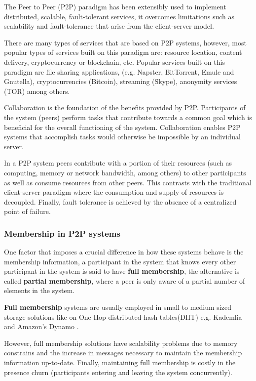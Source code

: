 

The Peer to Peer (P2P) paradigm has been extensibly used to implement distributed, scalable, fault-tolerant services, it overcomes limitations such as scalability and fault-tolerance that arise from the client-server model. 

There are many types of services that are based on P2P systems, however, most popular types of services built on this paradigm are: resource location, content delivery, cryptocurrency or blockchain, etc. Popular services built on this paradigm are file sharing applications, (e.g. Napster, BitTorrent, Emule and Gnutella), cryptocurrencies (Bitcoin), streaming (Skype), anonymity services (TOR) among others. 

Collaboration is the foundation of the benefits provided by P2P. Participants of the system (peers) perform tasks that contribute towards a common goal which is beneficial for the overall functioning of the system. Collaboration enables P2P systems that accomplish tasks would otherwise be impossible by an individual server.  %

In a P2P system peers contribute with a portion of their resources (such as computing, memory or network bandwidth, among others) to other participants as well as consume resources from other peers. This contrasts with the traditional client-server paradigm where the consumption and supply of resources is decoupled. Finally, fault tolerance is achieved by the absence of a centralized point of failure.

\subsubsection{Membership in P2P systems}

One factor that imposes a crucial difference in how these systems behave is the membership information, a participant in the system that knows every other participant in the system is said to have \textbf{full membership}, the alternative is called \textbf{partial membership}, where a peer is only aware of a partial number of elements in the system.

\textbf{Full membership} systems are usually employed in small to medium sized storage solutions like on One-Hop distributed hash tables(DHT) e.g. Kademlia \cite{10.1007/3-540-45748-8_5} and Amazon's Dynamo \cite{decandia2007dynamo}. 

However, full membership solutions  have scalability problems due to memory constrains and the increase in messages necessary to maintain the membership information up-to-date. Finally, maintaining full membership is costly in the presence churn (participants entering and leaving the system concurrently). %

